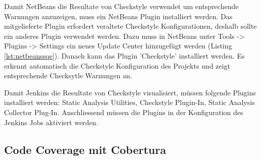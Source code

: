 

Damit NetBeans die Resultate von Checkstyle verwendet um entsprechende Warnungen anzuzeigen, muss ein NetBeans Plugin installiert werden. Das mitgelieferte Plugin erfordert veraltete Checkstyle Konfigurationen, deshalb sollte ein anderes Plugin verwendet werden. Dazu muss in NetBeans unter Tools -> Plugins -> Settings ein neues Update Center hinzugefügt werden (Listing \ref{lst:netbeanssqe}). Danach kann das Plugin 'Checkstyle' installiert werden. Es erkennt automatisch die Checkstyle Konfiguration des Projekts und zeigt entsprechende Checksytle Warnungen an.



Damit Jenkins die Resultate von Checkstyle visualisiert, müssen folgende Plugins installiert werden: Static Analysis Utilities, Checkstyle Plugin-In, Static Analysis Collector Plug-In. Anschliessend müssen die Plugins in der Konfiguration des Jenkins Jobs aktiviert werden.

\subsection{Code Coverage mit Cobertura}

